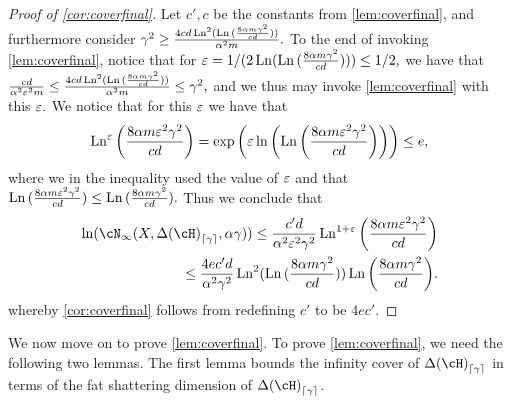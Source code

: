 \begin{proof}[Proof of \cref{cor:coverfinal}]
    Let $ c',c $ be the constants from \cref{lem:coverfinal}, and furthermore consider  $ \gamma^{2}\geq \frac{4cd\operatorname{\mathrm{Ln}}^{2}(\operatorname{\mathrm{Ln}}{ ( \frac{8\alpha m \gamma^{2}}{cd}) }) }{\alpha^{2}m}.$ To the end of invoking \cref{lem:coverfinal}, notice that for $ \varepsilon=1/(2\operatorname{\mathrm{Ln}}(\operatorname{\mathrm{Ln}}{(  \frac{8\alpha m \gamma^{2}}{cd})}) )\leq 1/2,$ we have that $\frac{cd}{\alpha^{2}\varepsilon^{2}m}\leq \frac{4cd\operatorname{\mathrm{Ln}}^{2}(\operatorname{\mathrm{Ln}}{ ( \frac{8\alpha m \gamma^{2}}{cd}) }) }{\alpha^{2}m}\leq \gamma^{2},$ and we thus may invoke \cref{lem:coverfinal} with this $ \varepsilon.$   We notice that for this $ \varepsilon $ we have that 
    \begin{align*}
        \operatorname{\mathrm{Ln}}^{\varepsilon}{\left(  \frac{8\alpha m\varepsilon^{2} \gamma^{2}}{cd} \right)}= \exp{\left(\varepsilon\ln{\left( \operatorname{\mathrm{Ln}}{\left(  \frac{8\alpha m\varepsilon^{2} \gamma^{2}}{cd} \right)}\right)} \right)} \leq  e, 
    \end{align*}
    where we in the inequality used the value of $ \varepsilon $ and that    $ \operatorname{\mathrm{Ln}}{(  \frac{8\alpha m\varepsilon^{2} \gamma^{2}}{cd} )}\leq\operatorname{\mathrm{Ln}}{(  \frac{8\alpha m \gamma^{2}}{cd} )}.$   
    Thus we conclude that
    \begin{align}
        \ln(\cN_{\infty}(X,\dlh_{\left\lceil\gamma\right\rceil} ,\alpha \gamma)) \leq
        \frac{c'd}{\alpha^{2}\eps^{2}\gamma^{2}} \Ln^{1+\eps}{\left(  \frac{8\alpha m\eps^{2}  \gamma^{2}}{cd} \right)}
        \\ \leq \frac{4ec'd}{\alpha^{2}\gamma^{2}}\Ln^{2}(\Ln{(  \frac{8\alpha m \gamma^{2}}{cd})}) \Ln{\left(  \frac{8\alpha m\gamma^{2}}{cd} \right)}.
    \end{align}
    whereby \cref{cor:coverfinal} follows from redefining $ c' $ to be $ 4ec'.$     
\end{proof}



We now move on to prove \cref{lem:coverfinal}. To prove \cref{lem:coverfinal}, we need the following two lemmas. The first lemma bounds the infinity cover of $ \dlh_{\left\lceil\gamma \right\rceil} $ in terms of the fat shattering dimension of $ \dlh_{\left\lceil\gamma \right\rceil} $.


